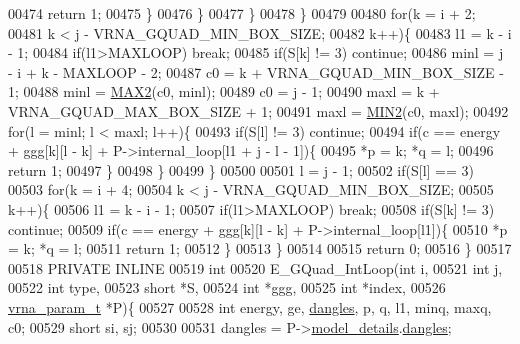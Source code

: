 \begin{DoxyCode}
00474           \textcolor{keywordflow}{return} 1;
00475         \}
00476       \}
00477     \}
00478   \}
00479 
00480   \textcolor{keywordflow}{for}(k = i + 2;
00481       k < j - VRNA\_GQUAD\_MIN\_BOX\_SIZE;
00482       k++)\{
00483     l1    = k - i - 1;
00484     \textcolor{keywordflow}{if}(l1>MAXLOOP) \textcolor{keywordflow}{break};
00485     \textcolor{keywordflow}{if}(S[k] != 3) \textcolor{keywordflow}{continue};
00486     minl  = j - i + k - MAXLOOP - 2;
00487     c0    = k + VRNA\_GQUAD\_MIN\_BOX\_SIZE - 1;
00488     minl  = \hyperlink{group__utils_gadd91367918fadbc8d585940d6206d6d2}{MAX2}(c0, minl);
00489     c0    = j - 1;
00490     maxl  = k + VRNA\_GQUAD\_MAX\_BOX\_SIZE + 1;
00491     maxl  = \hyperlink{group__utils_ga2dd4a927a7f937f43a90c144d79107d8}{MIN2}(c0, maxl);
00492     \textcolor{keywordflow}{for}(l = minl; l < maxl; l++)\{
00493       \textcolor{keywordflow}{if}(S[l] != 3) \textcolor{keywordflow}{continue};
00494       \textcolor{keywordflow}{if}(c == energy + ggg[k][l - k] + P->internal\_loop[l1 + j - l - 1])\{
00495         *p = k; *q = l;
00496         \textcolor{keywordflow}{return} 1;
00497       \}
00498     \}
00499   \}
00500 
00501   l = j - 1;
00502   \textcolor{keywordflow}{if}(S[l] == 3)
00503     \textcolor{keywordflow}{for}(k = i + 4;
00504         k < j - VRNA\_GQUAD\_MIN\_BOX\_SIZE;
00505         k++)\{
00506       l1    = k - i - 1;
00507       \textcolor{keywordflow}{if}(l1>MAXLOOP) \textcolor{keywordflow}{break};
00508       \textcolor{keywordflow}{if}(S[k] != 3) \textcolor{keywordflow}{continue};
00509       \textcolor{keywordflow}{if}(c == energy + ggg[k][l - k] + P->internal\_loop[l1])\{
00510         *p = k; *q = l;
00511         \textcolor{keywordflow}{return} 1;
00512       \}
00513     \}
00514 
00515   \textcolor{keywordflow}{return} 0;
00516 \}
00517 
00518 PRIVATE INLINE
00519 \textcolor{keywordtype}{int}
00520 E\_GQuad\_IntLoop(\textcolor{keywordtype}{int} i,
00521                 \textcolor{keywordtype}{int} j,
00522                 \textcolor{keywordtype}{int} type,
00523                 \textcolor{keywordtype}{short} *S,
00524                 \textcolor{keywordtype}{int} *ggg,
00525                 \textcolor{keywordtype}{int} *index,
00526                 \hyperlink{group__energy__parameters_structvrna__param__s}{vrna\_param\_t} *P)\{
00527 
00528   \textcolor{keywordtype}{int} energy, ge, \hyperlink{group__model__details_ga72b511ed1201f7e23ec437e468790d74}{dangles}, p, q, l1, minq, maxq, c0;
00529   \textcolor{keywordtype}{short} si, sj;
00530 
00531   dangles = P->\hyperlink{group__energy__parameters_a7b84353eb9075c595bad4ceb871bcae7}{model\_details}.\hyperlink{structvrna__md__s_adcda4ff2ea77748ae0e8700288282efc}{dangles};

\end{DoxyCode}
